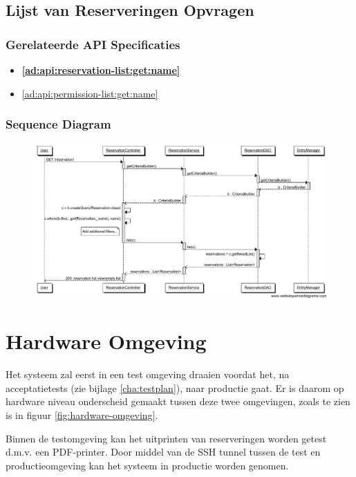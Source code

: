 \documentclass[a4paper,titlepage]{report}
\begin{document}
  \section{Lijst van Reserveringen Opvragen}
    \label{sec:get-records-sequence}
    \subsection{Gerelateerde API Specificaties}
      \begin{itemize}
        \item \textbf{\ref{ad:api:reservation-list:get:name}}
        \item \ref{ad:api:permission-list:get:name}
      \end{itemize}
    \subsection{Sequence Diagram}
    \begin{figure}[H]
      \label{fig:get-reservations-sequence}
      \centering
      \includegraphics[width=\textwidth,trim=0 0.4cm 0 0,clip]{get_reservations_sequence.pdf}
    \end{figure}



\chapter{Hardware Omgeving}
\label{cha:hardware-omgeving}
Het systeem zal eerst in een test omgeving draaien voordat het, na
acceptatietests (zie bijlage \ref{cha:testplan}), naar productie
gaat. Er is daarom op hardware niveau onderscheid gemaakt tussen deze twee
omgevingen, zoals te zien is in figuur \ref{fig:hardware-omgeving}.

Binnen de testomgeving kan het uitprinten van reserveringen worden getest d.m.v.
een PDF-printer. Door middel van de SSH tunnel tussen de test en productieomgeving kan het
systeem in productie worden genomen.
\end{document}
